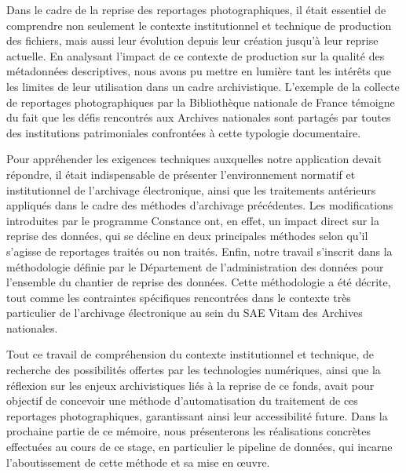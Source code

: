 Dans le cadre de la reprise des reportages photographiques, il était essentiel de comprendre non seulement le contexte institutionnel et technique de production des fichiers, mais aussi leur évolution depuis leur création jusqu'à leur reprise actuelle. En analysant l'impact de ce contexte de production sur la qualité des métadonnées descriptives, nous avons pu mettre en lumière tant les intérêts que les limites de leur utilisation dans un cadre archivistique. L'exemple de la collecte de reportages photographiques par la Bibliothèque nationale de France témoigne du fait que les défis rencontrés aux Archives nationales sont partagés par toutes des institutions patrimoniales confrontées à cette typologie documentaire.

Pour appréhender les exigences techniques auxquelles notre application devait répondre, il était indispensable de présenter l'environnement normatif et institutionnel de l'archivage électronique, ainsi que les traitements antérieurs appliqués dans le cadre des méthodes d'archivage précédentes. Les modifications introduites par le programme Constance ont, en effet, un impact direct sur la reprise des données, qui se décline en deux principales méthodes selon qu'il s'agisse de reportages traités ou non traités. Enfin, notre travail s'inscrit dans la méthodologie définie par le Département de l'administration des données pour l'ensemble du chantier de reprise des données. Cette méthodologie a été décrite, tout comme les contraintes spécifiques rencontrées dans le contexte très particulier de l'archivage électronique au sein du SAE Vitam des Archives nationales.

Tout ce travail de compréhension du contexte institutionnel et technique, de recherche des possibilités offertes par les technologies numériques, ainsi que la réflexion sur les enjeux archivistiques liés à la reprise de ce fonds, avait pour objectif de concevoir une méthode d'automatisation du traitement de ces reportages photographiques, garantissant ainsi leur accessibilité future. Dans la prochaine partie de ce mémoire, nous présenterons les réalisations concrètes effectuées au cours de ce stage, en particulier le pipeline de données, qui incarne l'aboutissement de cette méthode et sa mise en \oe{}uvre.